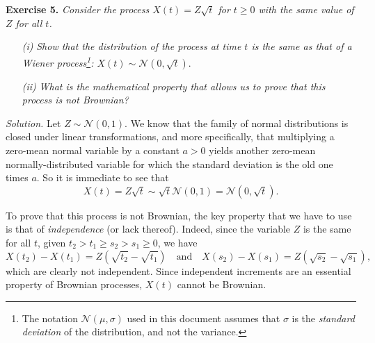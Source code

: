 
\textbf{Exercise 5. }\emph{Consider the process \( X(t) = Z\sqrt{t} \) for \( t \geq 0 \) with the same value of \( Z \) for all \( t \).}
\begin{enumerate}
  \item[\textit{(i)}] \emph{Show that the distribution of the process at time \( t \) is the same as that of a Wiener process\footnote{The notation $\mathcal N(\mu, \sigma)$ used in this document assumes that $\sigma$ is the \textit{standard deviation} of the distribution, and not the variance.}: \( X(t) \sim \mathcal{N}(0, \sqrt{t}) \)}.
  \item[\textit{(ii)}] \emph{What is the mathematical property that allows us to prove that this process is not Brownian?}
\end{enumerate}

\emph{Solution.} Let \( Z \sim \mathcal{N}(0, 1) \). We know that the family of normal distributions is closed under linear transformations, and more specifically, that multiplying a zero-mean normal variable by a constant $a>0$ yields another zero-mean normally-distributed variable for which the standard deviation is the old one times $a$. So it is immediate to see that
\[
X(t) = Z \sqrt{t} \sim \sqrt{t}\mathcal{N}(0, 1) = \mathcal{N}(0, \sqrt t).\]

To prove that this process is not Brownian, the key property that we have to use is that of \textit{independence} (or lack thereof). Indeed, since the variable $Z$ is the same for all $t$, given $t_2>t_1\geq s_2> s_1\geq 0$, we have
\[
X(t_2) - X(t_1) = Z(\sqrt{t_2} - \sqrt{t_1}) \quad \text{and} \quad X(s_2) - X(s_1) = Z(\sqrt{s_2} - \sqrt{s_1}),
\]
which are clearly not independent. Since independent increments are an essential property of Brownian processes, $X(t)$ cannot be Brownian.\\
